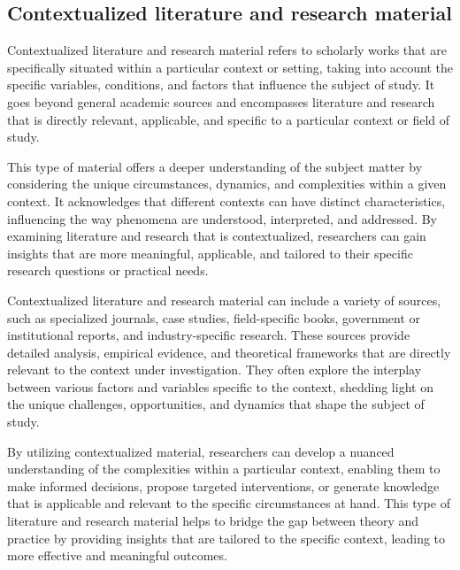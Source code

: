 \begin{spacing}{2.0}
\subsection{Contextualized literature and research material}

Contextualized literature and research material refers to scholarly works that are specifically situated within a particular context or setting, taking into account the specific variables, conditions, and factors that influence the subject of study. It goes beyond general academic sources and encompasses literature and research that is directly relevant, applicable, and specific to a particular context or field of study.

This type of material offers a deeper understanding of the subject matter by considering the unique circumstances, dynamics, and complexities within a given context. It acknowledges that different contexts can have distinct characteristics, influencing the way phenomena are understood, interpreted, and addressed. By examining literature and research that is contextualized, researchers can gain insights that are more meaningful, applicable, and tailored to their specific research questions or practical needs.

Contextualized literature and research material can include a variety of sources, such as specialized journals, case studies, field-specific books, government or institutional reports, and industry-specific research. These sources provide detailed analysis, empirical evidence, and theoretical frameworks that are directly relevant to the context under investigation. They often explore the interplay between various factors and variables specific to the context, shedding light on the unique challenges, opportunities, and dynamics that shape the subject of study.

By utilizing contextualized material, researchers can develop a nuanced understanding of the complexities within a particular context, enabling them to make informed decisions, propose targeted interventions, or generate knowledge that is applicable and relevant to the specific circumstances at hand. This type of literature and research material helps to bridge the gap between theory and practice by providing insights that are tailored to the specific context, leading to more effective and meaningful outcomes.


\end{spacing}
\newpage
